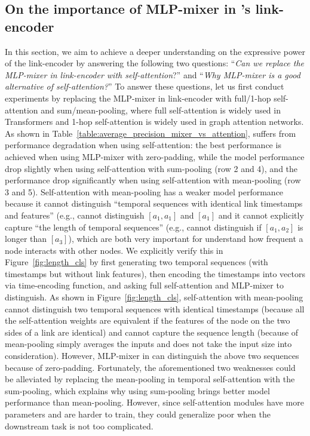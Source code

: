 
\subsection{On the importance of MLP-mixer in \oure's link-encoder} \label{section:expressive_power}

In this section, we aim to achieve a deeper understanding on the expressive power of the link-encoder by answering the following two questions: ``\textit{Can we replace the MLP-mixer in link-encoder with self-attention}?'' and ``\textit{Why MLP-mixer is a good alternative of self-attention?}''
To answer these questions, let us first conduct experiments by replacing the MLP-mixer in link-encoder with full/1-hop self-attention and sum/mean-pooling, where full self-attention is widely used in Transformers and 1-hop self-attention is widely used in graph attention networks. As shown in Table~\ref{table:average_precision_mixer_vs_attention}, \our suffers from performance degradation when using self-attention: the best performance is achieved when using MLP-mixer with zero-padding, while the model performance drop slightly when using self-attention with sum-pooling (row 2 and 4), and the performance drop significantly when using self-attention with mean-pooling (row 3 and 5). 
Self-attention with mean-pooling has a  weaker model performance because it cannot distinguish ``temporal sequences with identical link timestamps and features'' (e.g., cannot distinguish $[a_1, a_1]$ and $[a_1]$
and it cannot explicitly capture ``the length of temporal sequences'' (e.g., cannot distinguish if $[a_1, a_2]$ is longer than $[a_3]$), which are both very important for \our understand how frequent a node interacts with other nodes.
We explicitly verify this in Figure~\ref{fig:length_cls} by first generating two temporal sequences (with timestamps but without link features), then encoding the timestamps into vectors via time-encoding function, and asking full self-attention and MLP-mixer to distinguish.
As shown in Figure~\ref{fig:length_cls}, self-attention with mean-pooling cannot distinguish two temporal sequences with identical timestamps  (because all the self-attention weights are equivalent if the features of the node on the two sides of a link are identical) and cannot capture the sequence length (because of mean-pooling simply averages the inputs and does not take the input size into consideration).
However, MLP-mixer in \our can distinguish the above two sequences because of zero-padding.
Fortunately, the aforementioned two weaknesses could be alleviated by replacing the mean-pooling in temporal self-attention with the sum-pooling, which explains why using sum-pooling brings better model performance than mean-pooling.
However, since self-attention modules have more parameters and are harder to train, they could generalize poor when the downstream task is not too complicated.


